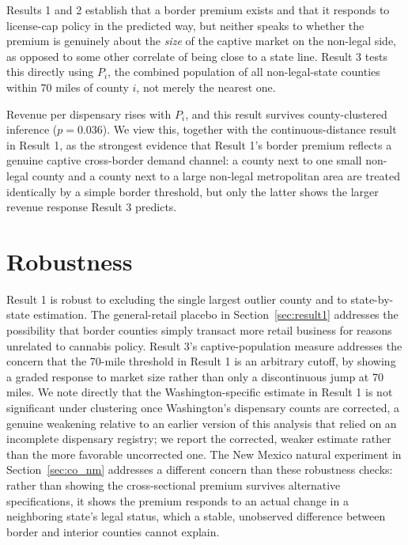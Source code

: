 \documentclass[12pt]{article}
\begin{document}
Results 1 and 2 establish that a border premium exists and that it responds to license-cap policy in the
predicted way, but neither speaks to whether the premium is genuinely about the \emph{size} of the captive
market on the non-legal side, as opposed to some other correlate of being close to a state line. Result 3
tests this directly using $P_i$, the combined population of all non-legal-state counties within 70 miles of
county $i$, not merely the nearest one.



Revenue per dispensary rises with $P_i$, and this result survives county-clustered inference ($p=0.036$).
We view this, together with the continuous-distance result in Result 1, as the strongest evidence that
Result 1's border premium reflects a genuine captive cross-border demand channel: a county next to one small
non-legal county and a county next to a large non-legal metropolitan area are treated identically by a
simple border threshold, but only the latter shows the larger revenue response Result 3 predicts.

\section{Robustness}

Result 1 is robust to excluding the single largest outlier county and to state-by-state estimation. The
general-retail placebo in Section~\ref{sec:result1} addresses the possibility that border counties simply
transact more retail business for reasons unrelated to cannabis policy. Result 3's captive-population measure
addresses the concern that the 70-mile threshold in Result 1 is an arbitrary cutoff, by showing a graded
response to market size rather than only a discontinuous jump at 70 miles. We note directly that the
Washington-specific estimate in Result 1 is not significant under clustering once Washington's dispensary
counts are corrected, a genuine weakening relative to an earlier version of this analysis that relied on an
incomplete dispensary registry; we report the corrected, weaker estimate rather than the more favorable
uncorrected one. The New Mexico natural experiment in Section~\ref{sec:co_nm} addresses a different concern
than these robustness checks: rather than showing the cross-sectional premium survives alternative
specifications, it shows the premium responds to an actual change in a neighboring state's legal status,
which a stable, unobserved difference between border and interior counties cannot explain.
\end{document}

